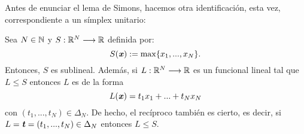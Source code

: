 Antes de enunciar el lema de Simons, hacemos otra identificación, esta vez, correspondiente a un símplex unitario:
\bigskip
\begin{lemaBox}\label{lema2.1}
	Sea $ N \in \mathbb{N} $ y $ S: \mathbb{R}^N \longrightarrow \mathbb{R} $ definida por: \[ S(\textbf{\emph{x}}):=\max\{x_1,...,x_N\}.\] Entonces, $ S $ es sublineal. Además, si $ L:\mathbb{R}^N \longrightarrow \mathbb{R} $ es un funcional lineal tal que $ L \leq S $ entonces $ L $ es de la forma \[ L(\textbf{\emph{x}}) = t_1 x_1 + ... + t_N x_N \] con $ (t_1,...,t_N) \in \Delta_N$. De hecho, el recíproco también es cierto, es decir, si $ L = \textbf{\emph{t}} = (t_1,...,t_N) \in \Delta_N $ entonces $ L \leq S $.
	
	
\end{lemaBox}

